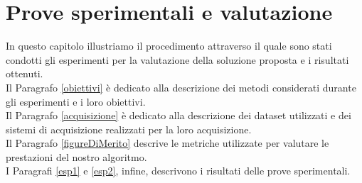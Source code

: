 \chapter{Prove sperimentali e valutazione}
\label{ProveSperimentali}
\thispagestyle{empty}

\vspace{0.5cm}
\noindent In questo capitolo illustriamo il procedimento attraverso il quale sono stati condotti gli esperimenti per la valutazione della soluzione proposta e i risultati ottenuti.\\
Il Paragrafo \ref{obiettivi} \`e dedicato alla descrizione dei metodi considerati durante gli esperimenti e i loro obiettivi.\\ 
Il Paragrafo \ref{acquisizione} \`e dedicato alla descrizione dei dataset utilizzati e dei sistemi di acquisizione realizzati per la loro acquisizione.\\
Il Paragrafo \ref{figureDiMerito} descrive le metriche utilizzate per valutare le prestazioni del nostro algoritmo.\\
I Paragrafi \ref{esp1} e \ref{esp2}, infine, descrivono i risultati delle prove sperimentali.
